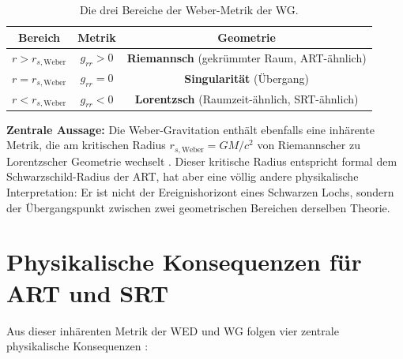 \begin{table}[htbp]
\centering
\begin{tabular}{|c|c|c|}
\hline
\textbf{Bereich} & \textbf{Metrik} & \textbf{Geometrie} \\
\hline
\( r > r_{s,\text{Weber}} \) & \( g_{rr} > 0 \) & \textbf{Riemannsch} (gekrümmter Raum, ART-ähnlich) \\
\hline
\( r = r_{s,\text{Weber}} \) & \( g_{rr} = 0 \) & \textbf{Singularität} (Übergang) \\
\hline
\( r < r_{s,\text{Weber}} \) & \( g_{rr} < 0 \) & \textbf{Lorentzsch} (Raumzeit-ähnlich, SRT-ähnlich) \\
\hline
\end{tabular}
\caption{Die drei Bereiche der Weber-Metrik der WG.}
\label{tab:weber_metrik_bereiche_wg}
\end{table}

\textbf{Zentrale Aussage:} Die Weber-Gravitation enthält ebenfalls eine inhärente Metrik, die am kritischen Radius \( r_{s,\text{Weber}} = GM/c^2 \) von Riemannscher zu Lorentzscher Geometrie wechselt \cite{FrauenfelderWeber2024}. Dieser kritische Radius entspricht formal dem Schwarzschild-Radius der ART, hat aber eine völlig andere physikalische Interpretation: Er ist nicht der Ereignishorizont eines Schwarzen Lochs, sondern der Übergangspunkt zwischen zwei geometrischen Bereichen derselben Theorie.

\section{Physikalische Konsequenzen für ART und SRT}
\label{app:weber_metrik_konsequenzen}

Aus dieser inhärenten Metrik der WED und WG folgen vier zentrale physikalische Konsequenzen \cite{FrauenfelderWeber2024,Assis2005,Assis2012}:

